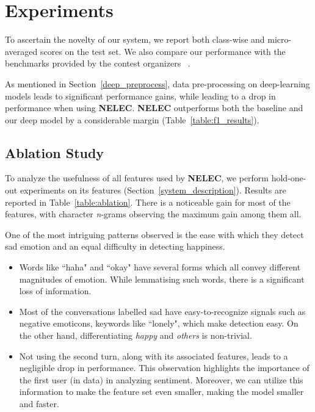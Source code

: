 \documentclass[11pt,a4paper]{article}
\begin{document}
\section{Experiments}

To ascertain the novelty of our system, we report both class-wise and micro-averaged  scores on the test set. We also compare our performance with the benchmarks provided by the contest organizers ~\cite{chatterjee2019understanding}.

As mentioned in Section~\ref{deep_preprocess}, data pre-processing on deep-learning models leads to significant performance gains, while leading to a drop in performance when using \textbf{NELEC}. \textbf{NELEC} outperforms both the baseline and our deep model by a considerable margin (Table~\ref{table:f1_results}).

\subsection{Ablation Study}

To analyze the usefulness of all features used by \textbf{NELEC}, we perform hold-one-out experiments on its features (Section~\ref{system_description}). Results are reported in Table~\ref{table:ablation}. There is a noticeable gain for most of the features, with character \textit{n}-grams observing the maximum gain among them all.

One of the most intriguing patterns observed is the ease with which they detect sad emotion and an equal difficulty in detecting happiness.
\begin{itemize}
    \item Words like ``haha" and ``okay" have several forms which all convey different magnitudes of emotion. While lemmatising such words, there is a significant loss of information.
    \item Most of the conversations labelled sad have easy-to-recognize signals such as negative emoticons, keywords like ``lonely", which make detection easy. On the other hand, differentiating \textit{happy} and \textit{others} is non-trivial.
    \item Not using the second turn, along with its associated features, leads to a negligible drop in  performance. This observation highlights the importance of the first user (in data) in analyzing sentiment. Moreover, we can utilize this information to make the feature set even smaller, making the model smaller and faster.
\end{itemize}
\end{document}
